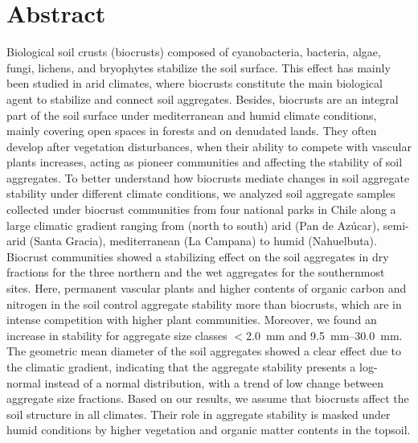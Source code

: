 \section*{Abstract} %
Biological soil crusts (biocrusts) composed of cyanobacteria, bacteria, algae, fungi, lichens, and bryophytes stabilize the soil surface. This effect has mainly been studied in arid climates, where biocrusts constitute the main biological agent to stabilize and connect soil aggregates. Besides, biocrusts are an integral part of the soil surface under mediterranean and humid climate conditions, mainly covering open spaces in forests and on denudated lands. They often develop after vegetation disturbances, when their ability to compete with vascular plants increases, acting as pioneer communities and affecting the stability of soil aggregates. To better understand how biocrusts mediate changes in soil aggregate stability under different climate conditions, we analyzed soil aggregate samples collected under biocrust communities from four national parks in Chile along a large climatic gradient ranging from (north to south) arid (Pan de Azúcar), semi-arid (Santa Gracia), mediterranean (La Campana) to humid (Nahuelbuta). Biocrust communities showed a stabilizing effect on the soil aggregates in dry fractions for the three northern and the wet aggregates for the southernmost sites. Here, permanent vascular plants and higher contents of organic carbon and nitrogen in the soil control aggregate stability more than biocrusts, which are in intense competition with higher plant communities. Moreover, we found an increase in stability for aggregate size classes $<$\SI{2.0}{\milli\meter} and \SIrange[range-phrase=--,range-units=single]{9.5}{30.0}{\milli\meter}. The geometric mean diameter of the soil aggregates showed a clear effect due to the climatic gradient, indicating that the aggregate stability presents a log-normal instead of a normal distribution, with a trend of low change between aggregate size fractions. Based on our results, we assume that biocrusts affect the soil structure in all climates. Their role in aggregate stability is masked under humid conditions by higher vegetation and organic matter contents in the topsoil.

